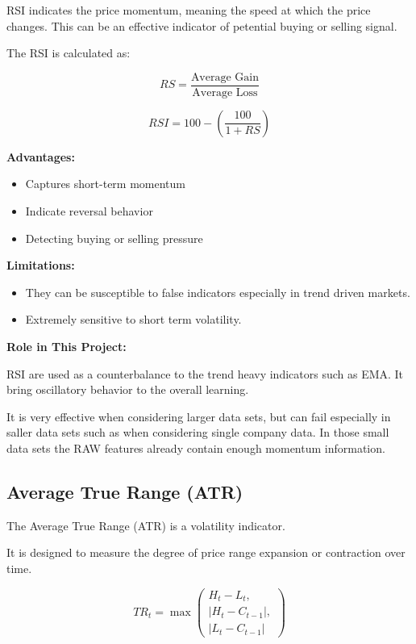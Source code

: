 RSI indicates the price momentum, meaning the speed at which the price changes. This can be an effective indicator of petential buying or selling signal.

The RSI is calculated as:

\begin{equation}
RS = \frac{\text{Average Gain}}{\text{Average Loss}}
\end{equation}

\begin{equation}
RSI = 100 - \left( \frac{100}{1 + RS} \right)
\end{equation}

\textbf{Advantages:}
\begin{itemize}
    \item Captures short-term momentum
    \item Indicate reversal behavior
    \item Detecting buying or selling pressure
\end{itemize}

\textbf{Limitations:}
\begin{itemize}
    \item They can be susceptible to false indicators especially in trend driven markets.
    \item Extremely sensitive to short term volatility.
\end{itemize}

\textbf{Role in This Project:}  

RSI are used as a counterbalance to the trend heavy indicators such as EMA. It bring oscillatory behavior to the overall learning.

It is very effective when considering larger data sets, but can fail especially in saller data sets such as when considering single company data. In those small data sets the RAW features already contain enough momentum information.

\subsection{Average True Range (ATR)}

The Average True Range (ATR) is a volatility indicator.

It is designed to measure the degree of price range expansion or contraction over time.

\begin{equation}
TR_t = \max \left(
\begin{array}{l}
H_t - L_t, \\
|H_t - C_{t-1}|, \\
|L_t - C_{t-1}|
\end{array}
\right)
\end{equation}

